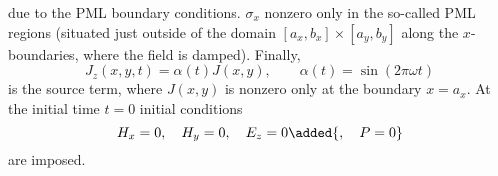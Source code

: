 \documentclass[11pt]{elsarticle}
\begin{document}
due to the PML boundary conditions. $\sigma_{x}$ 
nonzero only in the so-called PML regions (situated just outside
of the domain $[a_x,b_x]\times[a_y,b_y]$ along the $x$-boundaries,
where the field is damped).  
Finally,
\begin{equation}
\label{src}
J_z(x,y,t)=\alpha(t) J(x,y), \qquad \alpha(t)=\sin(2\pi\omega t)
\end{equation}
is the source term, 
where $J(x,y)$ is nonzero only at the boundary $x=a_x$.
At the initial time $t=0$ initial conditions 
\begin{equation}
\label{ic1}  
H_x = 0, \quad H_y = 0, \quad E_z = 0\added{,\quad P=0}
\end{equation}
are imposed.
\end{document}
